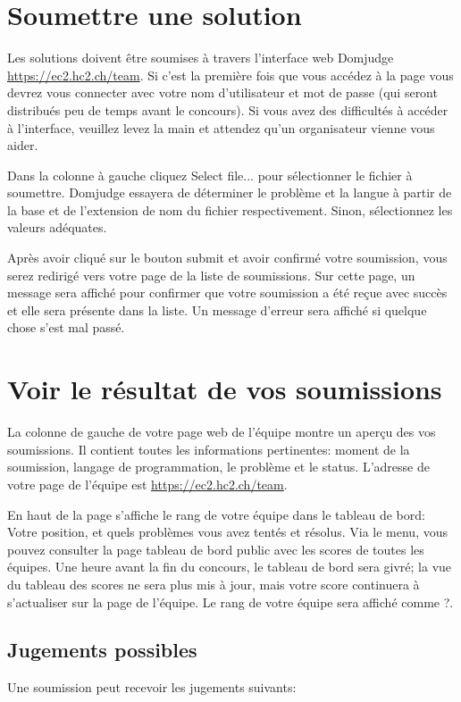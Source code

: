 \clearpage
\section{Soumettre une solution}
\label{sec:submit}
Les solutions doivent être soumises à travers 
l'interface web Domjudge \url{https://ec2.hc2.ch/team}.
Si c'est la première fois que vous accédez à la page
vous devrez vous connecter avec votre nom d'utilisateur et mot de passe 
(qui seront distribués peu de temps avant le concours).
Si vous avez des difficultés à accéder à l'interface, 
veuillez levez la main et attendez qu'un organisateur vienne
vous aider.


Dans la colonne à gauche cliquez \og Select file...\fg{}
pour sélectionner le fichier à soumettre.
Domjudge essayera de déterminer le problème et la langue
à partir de la base et de l'extension de nom du fichier
respectivement. Sinon, sélectionnez les valeurs adéquates.

Après avoir cliqué sur le bouton \og submit\fg{}  et avoir confirmé
votre soumission, vous serez redirigé vers votre page de 
la liste de soumissions. Sur cette page, un message
sera affiché pour confirmer que  votre soumission a été
reçue avec succès et elle sera présente dans la liste.
Un message d'erreur sera affiché si quelque chose s'est mal passé.

\section{Voir le résultat de vos soumissions}
La colonne de gauche de votre page web de l'équipe montre un aperçu des
vos soumissions. Il contient toutes les informations pertinentes:
moment de la soumission, langage de programmation, 
le problème et le status. L'adresse de votre page de l'équipe est
\url{https://ec2.hc2.ch/team}.


En haut de la page s'affiche le rang de votre équipe 
dans le tableau de bord:
Votre position, et quels problèmes vous avez tentés et résolus.
Via le menu, vous pouvez consulter la page tableau de bord public
avec les scores de toutes les équipes. Une heure avant la fin du concours, le tableau de bord sera \og givré\fg{};
la vue du tableau des scores ne sera plus mis à jour, mais votre score continuera à s'actualiser sur la page de l'équipe.
Le rang de votre équipe sera affiché comme \og ?\fg{}.

\subsection{Jugements possibles}
Une soumission peut recevoir les jugements suivants:

